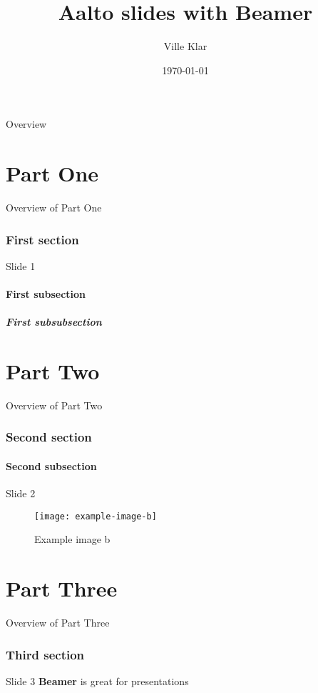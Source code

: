 \documentclass[aspectratio=169]{beamer}
\title{Aalto slides with Beamer}
\author{Ville Klar}
\date{\today}
\begin{document}
\frame{\titlepage}

\begin{frame}{Overview}
    \tableofcontents[part=1]
    \tableofcontents[part=2]
    \tableofcontents[part=3]
\end{frame}

\part{Part One}
\begin{frame}{Overview of Part One}\tableofcontents\end{frame}
\section{First section}
\begin{frame}{Slide 1}   
    \blindtext
\end{frame}              
\subsection{First subsection}
\subsubsection{First subsubsection}

\part{Part Two}
\begin{frame}{Overview of Part Two}\tableofcontents\end{frame}
\section{Second section}
\subsection{Second subsection}
\begin{frame}{Slide 2}   
    \begin{figure}
        \texttt{[image: example-image-b]}
        \caption{Example image b}
    \end{figure}
\end{frame}              

\part{Part Three}
\begin{frame}{Overview of Part Three}\tableofcontents\end{frame}
\section{Third section}
\begin{frame}{Slide 3}   
    \huge{\textbf{Beamer} is great for presentations}
\end{frame}              
\end{document}
